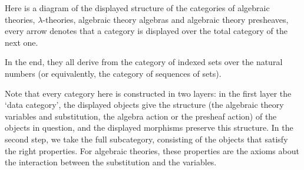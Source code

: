 Here is a diagram of the displayed structure of the categories of algebraic theories, $ \lambda $-theories, algebraic theory algebras and algebraic theory presheaves, every arrow denotes that a category is displayed over the total category of the next one.
\begin{center}
\end{center}
In the end, they all derive from the category of indexed sets over the natural numbers (or equivalently, the category of sequences of sets).

Note that every category here is constructed in two layers: in the first layer the `data category', the displayed objects give the structure (the algebraic theory variables and substitution, the algebra action or the presheaf action) of the objects in question, and the displayed morphisms preserve this structure. In the second step, we take the full subcategory, consisting of the objects that satisfy the right properties. For algebraic theories, these properties are the axioms about the interaction between the substitution and the variables.

